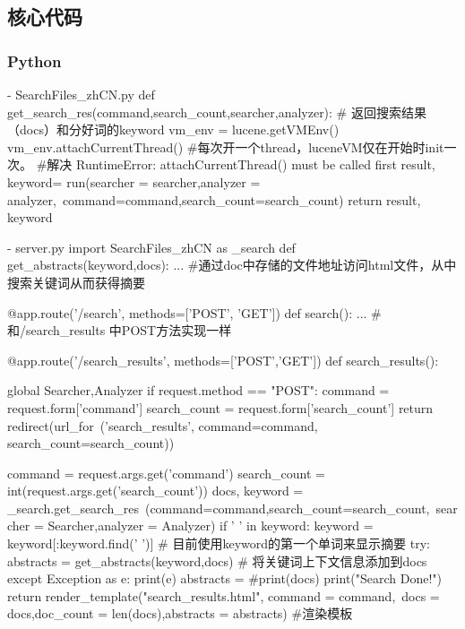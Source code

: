 \documentclass[12pt,a4paper]{article}
\begin{document}
\subsection{核心代码}
\subsubsection{Python}
\begin{python}
- SearchFiles_zhCN.py
def get_search_res(command,search_count,searcher,analyzer):   
	# 返回搜索结果（docs）和分好词的keyword
    vm_env = lucene.getVMEnv()             
    vm_env.attachCurrentThread()    
    #每次开一个thread，luceneVM仅在开始时init一次。
    #解决 RuntimeError: attachCurrentThread() must be called first
    result, keyword= run(searcher = searcher,analyzer = analyzer,\
    command=command,search_count=search_count)
    return result, keyword
\end{python}
\begin{python}
- server.py
import SearchFiles_zhCN as _search
def get_abstracts(keyword,docs):
	...
	#通过doc中存储的文件地址访问html文件，从中搜索关键词从而获得摘要
	
@app.route('/search', methods=['POST', 'GET'])
def search():
	...
	#和/search_results 中POST方法实现一样
	
@app.route('/search_results', methods=['POST','GET'])
def search_results():
    
    global Searcher,Analyzer
    if request.method == "POST":
        command = request.form['command']
        search_count = request.form['search_count']
        return redirect(url_for\
        ('search_results', command=command, search_count=search_count))
    
    command = request.args.get('command')
    search_count = int(request.args.get('search_count'))
    docs, keyword = _search.get_search_res\
    (command=command,search_count=search_count,\
    searcher = Searcher,analyzer = Analyzer)
    if ' ' in keyword:
        keyword = keyword[:keyword.find(' ')]   
        # 目前使用keyword的第一个单词来显示摘要
    try:
        abstracts = get_abstracts(keyword,docs)  
        # 将关键词上下文信息添加到docs
    except Exception as e:
        print(e)
        abstracts = {}
    #print(docs)
    print("Search Done!")
    return render_template("search_results.html", command = command,\
    docs = docs,doc_count = len(docs),abstracts = abstracts)
    #渲染模板

\end{python}
\end{document}
